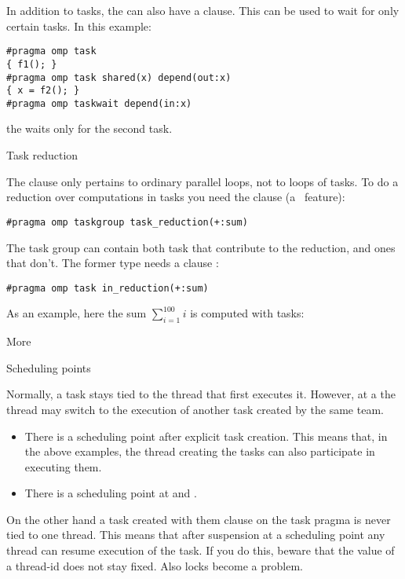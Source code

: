In addition to tasks, the  can also
have a  clause.
This can be used to wait for only certain tasks.
In this example:
\begin{lstlisting}[language=omp]
#pragma omp task 
{ f1(); }
#pragma omp task shared(x) depend(out:x)
{ x = f2(); }
#pragma omp taskwait depend(in:x)
\end{lstlisting}
the  waits only for the second task.

 {Task reduction}

The  clause only pertains to ordinary parallel loops,
not to  loops of tasks.
To do a reduction over computations in tasks you need the
 clause
(a~ feature):
\begin{lstlisting}[language=omp]
#pragma omp taskgroup task_reduction(+:sum)
\end{lstlisting}
The task group can contain both task that contribute to the reduction,
and ones that don't. The former type needs a clause :
\begin{lstlisting}[language=omp]
#pragma omp task in_reduction(+:sum)
\end{lstlisting}

As an example, here the sum $\sum_{i=1}^{100} i$ is computed with tasks:
%

 {More}

 {Scheduling points}

Normally, a task stays tied to the thread that first executes it.
However, at a  the thread may
switch to the execution of another task created by the same team.
\begin{itemize}
\item There is a scheduling point after explicit task creation. This
  means that, in the above examples, the thread creating the tasks can
  also participate in executing them.
\item There is a scheduling point at  and .
\end{itemize}

On the other hand a task created with them  clause
on the task pragma is never tied to one thread. This means that after
suspension at a scheduling point any thread can resume execution of
the task.
If you do this, beware
that the value of a thread-id does not stay fixed. Also locks become a problem.

